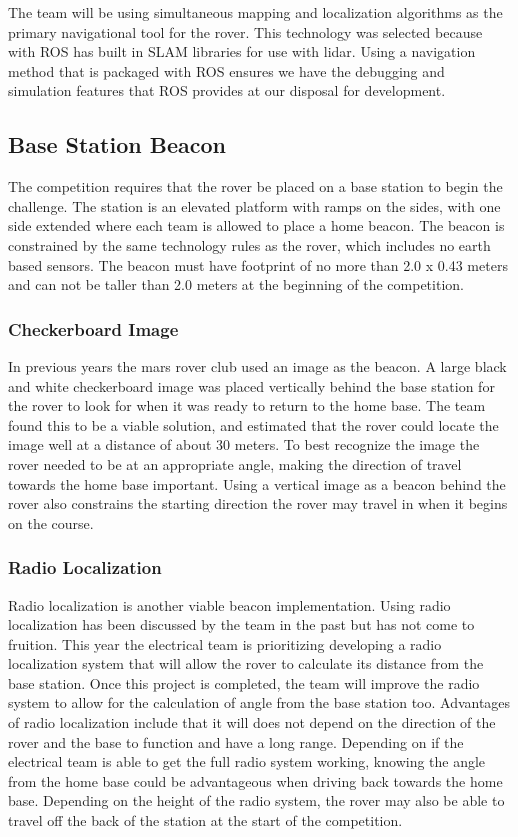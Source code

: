 \documentclass[10pt, oneside,onecolumn]{IEEEtran}
\begin{document}
	The team will be using simultaneous mapping and localization algorithms as the primary navigational tool for the rover. This technology was selected because with ROS has built in SLAM libraries for use with lidar. Using a navigation method that is packaged with ROS ensures we have the debugging and simulation features that ROS provides at our disposal for development.

\subsection{Base Station Beacon}

	The competition requires that the rover be placed on a base station to begin the challenge. The station is an elevated platform with ramps on the sides, with one side extended  where each team is allowed to place a home beacon. The beacon is constrained by the same technology rules as the rover, which includes no earth based sensors. The beacon must have footprint of no more than 2.0 x 0.43 meters and can not be taller than 2.0 meters at the beginning of the competition. 

\subsubsection{Checkerboard Image}

	In previous years the mars rover club used an image as the beacon. A large black and white checkerboard image was placed vertically behind the base station for the rover to look for when it was ready to return to the home base. The team found this to be a viable solution, and estimated that the rover could locate the image well at a distance of about 30 meters. To best recognize the image the rover needed to be at an appropriate angle, making the direction of travel towards the home base important. Using a vertical image as a beacon behind the rover also constrains the starting direction the rover may travel in when it begins on the course.

\subsubsection{Radio Localization}

	Radio localization is another viable beacon implementation. Using radio localization has been discussed by the team in the past but has not come to fruition. This year the electrical team is prioritizing developing a radio localization system that will allow the rover to calculate its distance from the base station. Once this project is completed, the team will improve the radio system to allow for the calculation of angle from the base station too. Advantages of radio localization include that it will does not depend on the direction of the rover and the base to function and have a long range. Depending on if the electrical team is able to get the full radio system working, knowing the angle from the home base could be advantageous when driving back towards the home base. Depending on the height of the radio system, the rover may also be able to travel off the back of the station at the start of the competition. 
\end{document}
